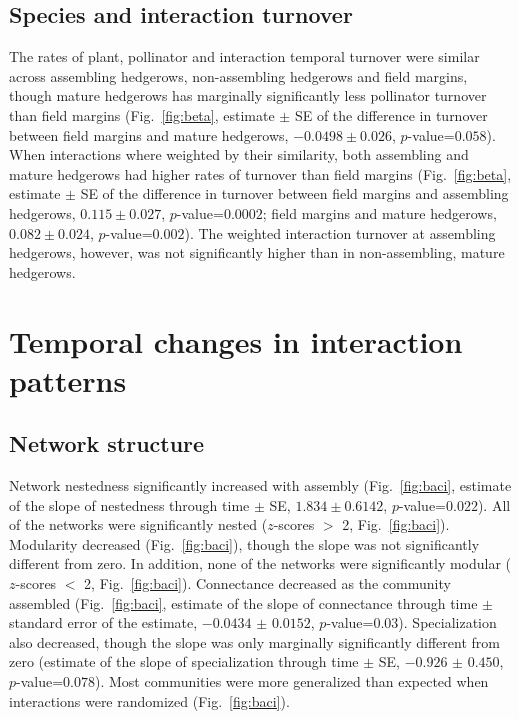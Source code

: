\documentclass[12pt]{article}
\begin{document}
\subsection*{Species and interaction turnover}
The rates of plant, pollinator and interaction temporal turnover were
similar across assembling hedgerows, non-assembling hedgerows and
field margins, though mature hedgerows has marginally significantly
less pollinator turnover than field margins (Fig.~\ref{fig:beta},
estimate $\pm$ SE of the difference in turnover between field margins
and mature hedgerows, $-0.0498 \pm 0.026$, $p$-value=$0.058$). When
interactions where weighted by their similarity, both assembling and
mature hedgerows had higher rates of turnover than field margins
(Fig.~\ref{fig:beta}, estimate $\pm$ SE of the difference in turnover
between field margins and assembling hedgerows, $0.115 \pm 0.027$,
$p$-value=$0.0002$; field margins and mature hedgerows, $0.082 \pm
0.024$, $p$-value=$0.002$). The weighted interaction turnover at
assembling hedgerows, however, was not significantly higher than in
non-assembling, mature hedgerows.

\section*{Temporal changes in interaction patterns}
\subsection*{Network structure}
Network nestedness significantly increased with assembly
(Fig.~\ref{fig:baci}, estimate of the slope of nestedness through time
$\pm$ SE, $1.834 \pm 0.6142$, $p$-value=$0.022$). All of the networks
were significantly nested ($z$-scores $>$ 2,
Fig.~\ref{fig:baci}). Modularity decreased (Fig.~\ref{fig:baci}),
though the slope was not significantly different from
zero. %
In addition, none of the networks were significantly modular
($z$-scores $<$ 2, Fig.~\ref{fig:baci}). Connectance decreased as the
community assembled (Fig.~\ref{fig:baci}, estimate of the slope of
connectance through time $\pm$ standard error of the estimate,
$-0.0434$ $\pm$ $0.0152$, $p$-value=$0.03$). Specialization also
decreased, though the slope was only marginally significantly
different from zero (estimate of the slope of specialization through
time $\pm$ SE, $-0.926$ $\pm$ $0.450$, $p$-value=$0.078$). Most
communities were more generalized than expected when interactions were
randomized (Fig.~\ref{fig:baci}).
\end{document}
